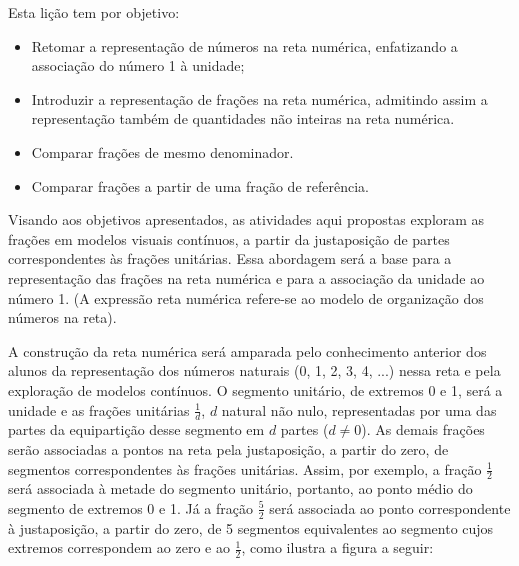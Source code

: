 

\noindent {\color{special}{\Large \bf LIÇÃO 3 - Para o professor}}
\vspace{.5cm}

Esta lição tem por objetivo: 
\begin{itemize}
 \item Retomar a representação de números na reta numérica, enfatizando a associação do número 1 à unidade;
 \item Introduzir a representação de frações na reta numérica, admitindo assim a representação também de quantidades não inteiras na reta numérica.
 \item Comparar frações de mesmo denominador.
 \item Comparar frações a partir de uma fração de referência.
\end{itemize}

Visando aos objetivos apresentados, as atividades aqui propostas exploram as frações em modelos visuais contínuos, a partir da justaposição de partes correspondentes às frações unitárias. Essa abordagem será a base para a representação das frações na reta numérica e para a associação da unidade ao número 1.  (A expressão reta numérica refere-se ao modelo de organização dos números na reta). 

A construção da reta numérica será amparada pelo conhecimento anterior dos alunos da representação dos números naturais (0, 1, 2, 3, 4, ...) nessa reta e pela exploração de modelos contínuos. O segmento unitário, de extremos 0 e 1, será a unidade e as frações unitárias $\frac{1}{d}$, $d$ natural não nulo, representadas por uma das partes da equipartição desse segmento em $d$ partes ($d\neq0$). As demais frações serão associadas a pontos na reta pela justaposição, a partir do zero, de segmentos correspondentes às frações unitárias. Assim, por exemplo, a fração $\frac{1}{2}$ será associada à metade do segmento unitário, portanto, ao ponto médio do segmento de extremos 0 e 1. Já a fração $\frac{5}{2}$ será associada ao ponto correspondente à justaposição, a partir do zero, de 5 segmentos equivalentes ao segmento cujos extremos correspondem ao zero e ao $\frac{1}{2}$, como ilustra a figura a seguir:

